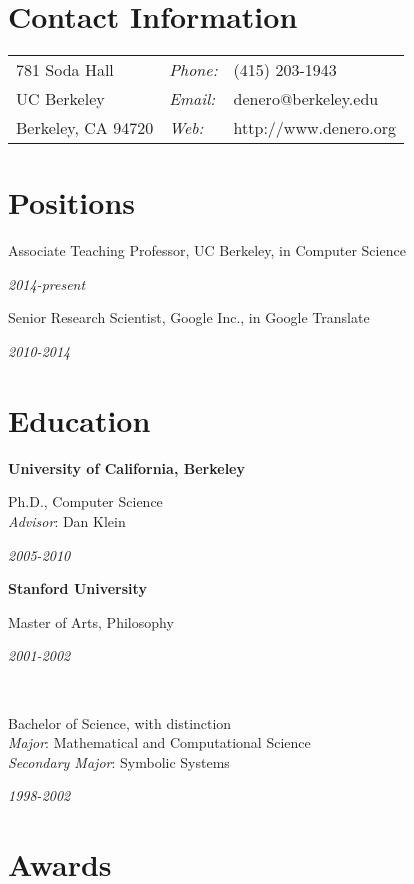 \documentclass[margin,line]{res}
\newcommand{\dated}[2]{\parbox[t]{4.4in}{#1} \hspace{0.4in}
											 \parbox[t]{1in}{ {\it #2 } } }
\begin{document}

\begin{resume}

\section{\sc Contact Information}
\vspace{.05in}
\begin{tabular}{@{}p{2in}lp{4in}}
781 Soda Hall         & {\it Phone:} & (415) 203-1943        \\
UC Berkeley           & {\it Email:} & denero@berkeley.edu   \\
Berkeley, CA  94720   & {\it Web:}   & http://www.denero.org \\
\end{tabular}

\section{\sc Positions}

	\dated{Associate Teaching Professor, UC Berkeley, in Computer Science}
	{ 2014-present }

	\dated{Senior Research Scientist, Google Inc., in Google Translate}
	{ 2010-2014 }

\section{\sc Education}

	{\bf University of California, Berkeley} \\
	\dated{Ph.D., Computer Science \\
	\hspace*{1em} {\it Advisor}: Dan Klein}{ 2005-2010 }

	{\bf Stanford University} \\
	\dated{Master of Arts, Philosophy\vspace{0.12in}}{ 2001-2002 } \\
	\dated{Bachelor of Science, with distinction \\
	\hspace*{1em} {\it Major}: Mathematical and Computational Science \\
	\hspace*{1em} {\it Secondary Major}: Symbolic Systems}{ 1998-2002 }

\section{\sc Awards}


\end{resume}
\end{document}
